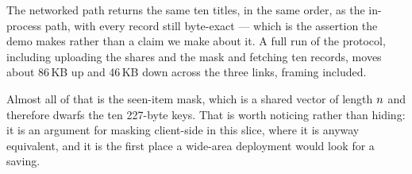 The networked path returns the same ten titles, in the same order, as the
in-process path, with every record still byte-exact --- which is the assertion
the demo makes rather than a claim we make about it. A full run of the
protocol, including uploading the shares and the mask and fetching ten records,
moves about 86\,KB up and 46\,KB down across the three links, framing included.

Almost all of that is the seen-item mask, which is a shared vector of length
$n$ and therefore dwarfs the ten 227-byte keys. That is worth noticing
rather than hiding: it is an argument for masking client-side in this slice,
where it is anyway equivalent, and it is the first place a wide-area deployment
would look for a saving.
